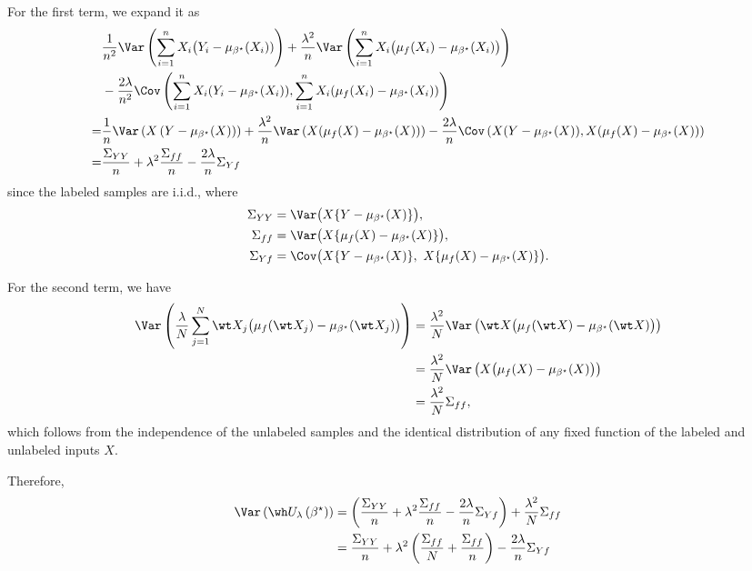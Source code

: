 \noindent
For the first term, we expand it as \begin{align*}
    &\frac{1}{n^2}\Var\left(\sum_{i=1}^n X_i\big(Y_i-\mu_{\beta^\star}(X_i))\right)+
    \frac{\lambda^2}{n}\Var\left(\sum_{i=1}^n X_i\big(\mu_f(X_i)-\mu_{\beta^\star}(X_i)\big)\right)\\
    &-\frac{2\lambda}{n^2}\Cov\left(\sum^n_{i=1}X_i(Y_i-\mu_{\beta^\star}(X_i)),\sum^n_{i=1}X_i(\mu_f(X_i)-\mu_{\beta^\star}(X_i))\right)\\
    =&\frac{1}{n}\Var\left(X\left(Y-\mu_{\beta^\star}(X)\right)\right)
    +\frac{\lambda^2}{n}\Var\left(X(\mu_f(X)-\mu_{\beta^\star}(X))\right)
    -\frac{2\lambda}{n}\Cov\left(X(Y-\mu_{\beta^\star}(X)),X(\mu_f(X)-\mu_{\beta^\star}(X))\right)\\
    =&\frac{\Sigma_{YY}}{n}+\lambda^2\frac{\Sigma_{ff}}{n}-\frac{2\lambda}{n}\Sigma_{Yf}
\end{align*}since the labeled samples are i.i.d., where \begin{align*}
\Sigma_{YY} &= \Var\big(X\{Y - \mu_{\beta^\star}(X)\}\big), \\
\Sigma_{ff} &= \Var\big(X\{\mu_f(X) - \mu_{\beta^\star}(X)\}\big), \\
\Sigma_{Yf} &= \Cov\big(X\{Y - \mu_{\beta^\star}(X)\},\ 
                      X\{\mu_f(X) - \mu_{\beta^\star}(X)\}\big).
\end{align*}

\noindent
For the second term, we have\begin{align*}
    \Var\left(\frac{\lambda}{N}\sum_{j=1}^N \wt X_j\big(\mu_f(\wt X_j)-\mu_{\beta^\star}(\wt X_j)\big)\right)
    &=\frac{\lambda^2}{N}\Var\left(\wt X\big(\mu_f(\wt X)-\mu_{\beta^\star}(\wt X)\big)\right)\\
    &=\frac{\lambda^2}{N}\Var\left( X\big(\mu_f( X)-\mu_{\beta^\star}(X)\big)\right)\\
    &=\frac{\lambda^2}{N}\Sigma_{ff},
\end{align*}which follows from the independence of the unlabeled samples and the identical distribution of any fixed function of the labeled and unlabeled inputs $X$.

\noindent
Therefore,\begin{align*}
    \Var\left(\wh U_\lambda\left(\beta^\star\right)\right)
    &=\left(\frac{\Sigma_{YY}}{n}+\lambda^2\frac{\Sigma_{ff}}{n}-\frac{2\lambda}{n}\Sigma_{Yf}\right)+\frac{\lambda^2}{N}\Sigma_{ff}\\
    &=\frac{\Sigma_{YY}}{n}+\lambda^2\left(\frac{\Sigma_{ff}}{N}+\frac{\Sigma_{ff}}{n}\right)-\frac{2\lambda}{n}\Sigma_{Yf}
\end{align*}

